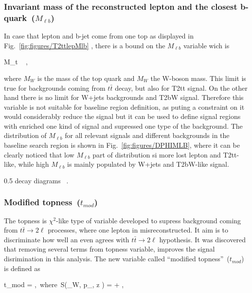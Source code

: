 \subsubsection{Invariant mass of the reconstructed lepton and the closest b-quark~($M_{\ell b}$)}

In case that lepton and b-jet come from one top as displayed in Fig.~\ref{fig:figures/T2ttlepMlb} , there is a bound on the $M_{\ell b}$ variable wich is

{
 M_{t}  ~ ,
}

where $M_{W}$ is the mass of the top quark and $M_{W}$ the W-boson mass. This limit is true for backgrounds coming from $t\bar{t}$ decay, but also for T2tt signal. On the other hand there is no limit for W+jets backgrounds and T2bW signal. Therefore this variable is not suitable for baseline region definition, as puting a constraint on it would considerably reduce the signal but it can be used to define signal regions with enriched one kind of signal and supressed one type of the background. The distribution of  $M_{\ell b}$ for all relevant signals and different backgrounds in the baseline search region is shown in Fig.~\ref{fig:figures/DPHIMLB}, where it can be clearly noticed that low $M_{\ell b}$ part of distribution si more lost lepton and T2tt-like, while high $M_{\ell b}$ is mainly populated by W+jets and T2bW-like signal.

                 {0.5}       %
                 { decay diagrams ~\cite{CMS:2016vew}. }

\subsubsection{Modified topness~($t_{mod}$)}

The topness is $\chi^{2}$-like type of variable developed to supress background coming from $t \bar{t} \to 2\ell$ processes, where one lepton in misreconstructed. It aim is to discriminate how well an even agrees with $t \bar{t} \to 2\ell$ hypothesis. It was discovered that removing several terms from topness variable, improves the signal disrimination in this analysis. The new variable called ``modified topness''~($t_{mod}$) is defined as


{
 t_{mod} = ,~where~S(_{W}, p_{\nu, z} ) =  + ,
}

